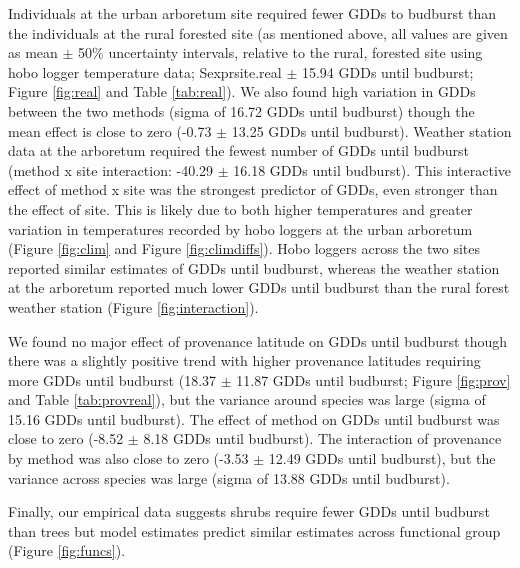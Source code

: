 \documentclass{article}\usepackage[]{graphicx}\usepackage[]{color}
\begin{document}
Individuals at the urban arboretum site required fewer GDDs to budburst than the individuals at the rural forested site (as mentioned above, all values are given as mean $\pm$ 50\% uncertainty intervals, relative to the rural, forested site using hobo logger temperature data; Sexpr{site.real} $\pm$ 15.94 GDDs until budburst; Figure \ref{fig:real} and Table \ref{tab:real}). We also found high variation in GDDs between the two methods (sigma of 16.72 GDDs until budburst) though the mean effect is close to zero (-0.73 $\pm$ 13.25 GDDs until budburst). Weather station data at the arboretum required the fewest number of GDDs until budburst (method x site interaction: -40.29 $\pm$ 16.18 GDDs until budburst). This interactive effect of method x site was the strongest predictor of GDDs, even stronger than the effect of site. This is likely due to both higher temperatures and greater variation in temperatures recorded by hobo loggers at the urban arboretum (Figure \ref{fig:clim} and Figure \ref{fig:climdiffs}). Hobo loggers across the two sites reported similar estimates of GDDs until budburst, whereas the weather station at the arboretum reported much lower GDDs until budburst than the rural forest weather station (Figure \ref{fig:interaction}).

We found no major effect of provenance latitude on GDDs until budburst though there was a slightly positive trend with higher provenance latitudes requiring more GDDs until budburst (18.37 $\pm$ 11.87 GDDs until budburst; Figure \ref{fig:prov} and Table \ref{tab:provreal}), but the variance around species was large (sigma of 15.16 GDDs until budburst). The effect of method on GDDs until budburst was close to zero (-8.52 $\pm$ 8.18 GDDs until budburst). The interaction of provenance by method was also close to zero (-3.53 $\pm$ 12.49 GDDs until budburst), but the variance across species was large (sigma of 13.88 GDDs until budburst).

Finally, our empirical data suggests shrubs require fewer GDDs until budburst than trees but model estimates predict similar estimates across functional group (Figure \ref{fig:funcs}).
\end{document}
